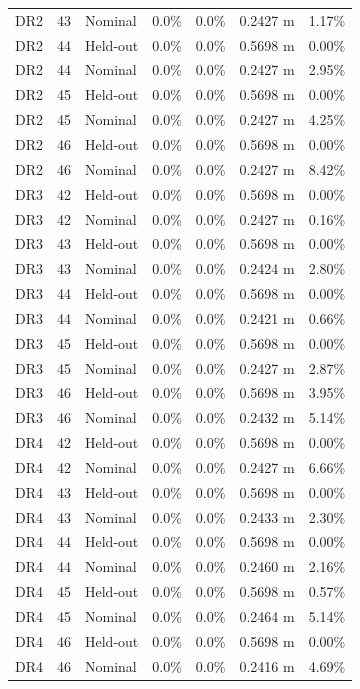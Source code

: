 \documentclass[11pt,a4paper,oneside]{book}
\begin{document}
\begin{longtable}{l l l l l l l}
DR2 & 43 & Nominal & 0.0\% & 0.0\% & 0.2427 m & 1.17\% \\
DR2 & 44 & Held-out & 0.0\% & 0.0\% & 0.5698 m & 0.00\% \\
DR2 & 44 & Nominal & 0.0\% & 0.0\% & 0.2427 m & 2.95\% \\
DR2 & 45 & Held-out & 0.0\% & 0.0\% & 0.5698 m & 0.00\% \\
DR2 & 45 & Nominal & 0.0\% & 0.0\% & 0.2427 m & 4.25\% \\
DR2 & 46 & Held-out & 0.0\% & 0.0\% & 0.5698 m & 0.00\% \\
DR2 & 46 & Nominal & 0.0\% & 0.0\% & 0.2427 m & 8.42\% \\
DR3 & 42 & Held-out & 0.0\% & 0.0\% & 0.5698 m & 0.00\% \\
DR3 & 42 & Nominal & 0.0\% & 0.0\% & 0.2427 m & 0.16\% \\
DR3 & 43 & Held-out & 0.0\% & 0.0\% & 0.5698 m & 0.00\% \\
DR3 & 43 & Nominal & 0.0\% & 0.0\% & 0.2424 m & 2.80\% \\
DR3 & 44 & Held-out & 0.0\% & 0.0\% & 0.5698 m & 0.00\% \\
DR3 & 44 & Nominal & 0.0\% & 0.0\% & 0.2421 m & 0.66\% \\
DR3 & 45 & Held-out & 0.0\% & 0.0\% & 0.5698 m & 0.00\% \\
DR3 & 45 & Nominal & 0.0\% & 0.0\% & 0.2427 m & 2.87\% \\
DR3 & 46 & Held-out & 0.0\% & 0.0\% & 0.5698 m & 3.95\% \\
DR3 & 46 & Nominal & 0.0\% & 0.0\% & 0.2432 m & 5.14\% \\
DR4 & 42 & Held-out & 0.0\% & 0.0\% & 0.5698 m & 0.00\% \\
DR4 & 42 & Nominal & 0.0\% & 0.0\% & 0.2427 m & 6.66\% \\
DR4 & 43 & Held-out & 0.0\% & 0.0\% & 0.5698 m & 0.00\% \\
DR4 & 43 & Nominal & 0.0\% & 0.0\% & 0.2433 m & 2.30\% \\
DR4 & 44 & Held-out & 0.0\% & 0.0\% & 0.5698 m & 0.00\% \\
DR4 & 44 & Nominal & 0.0\% & 0.0\% & 0.2460 m & 2.16\% \\
DR4 & 45 & Held-out & 0.0\% & 0.0\% & 0.5698 m & 0.57\% \\
DR4 & 45 & Nominal & 0.0\% & 0.0\% & 0.2464 m & 5.14\% \\
DR4 & 46 & Held-out & 0.0\% & 0.0\% & 0.5698 m & 0.00\% \\
DR4 & 46 & Nominal & 0.0\% & 0.0\% & 0.2416 m & 4.69\% \\
\bottomrule \end{longtable}
\end{document}
